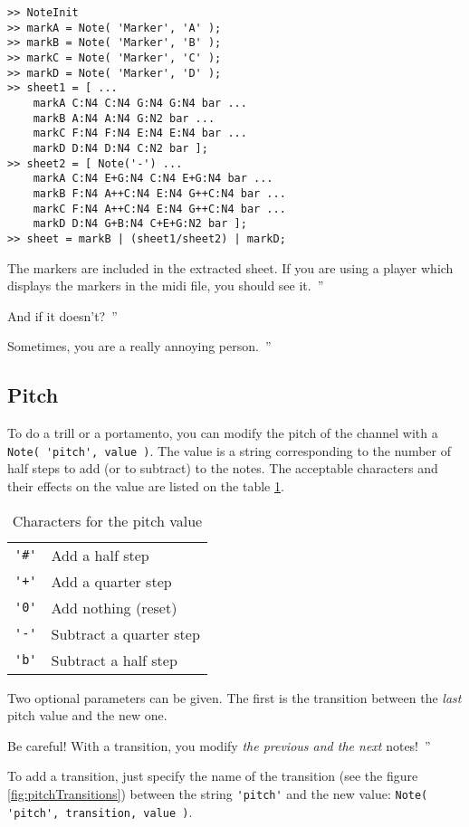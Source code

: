 \documentclass{article}
\newenvironment{meenv}{ \par \noindent \makebox[6em][r]{ \textcolor{mecolor}{Me}: `` --~}}{~''}
\newenvironment{myselfenv}{ \par \noindent \makebox[6em][r]{ \textcolor{myselfcolor}{Myself}: `` --~}}{~''}
\newcommand{\me}[1]{\begin{meenv}#1\end{meenv}}
\newcommand{\myself}[1]{\begin{myselfenv}#1\end{myselfenv}}
\begin{document}
\begin{lstlisting}
>> NoteInit
>> markA = Note( 'Marker', 'A' );
>> markB = Note( 'Marker', 'B' );
>> markC = Note( 'Marker', 'C' );
>> markD = Note( 'Marker', 'D' );
>> sheet1 = [ ...
	markA C:N4 C:N4 G:N4 G:N4 bar ...
	markB A:N4 A:N4 G:N2 bar ...
	markC F:N4 F:N4 E:N4 E:N4 bar ...
	markD D:N4 D:N4 C:N2 bar ];
>> sheet2 = [ Note('-') ...
	markA C:N4 E+G:N4 C:N4 E+G:N4 bar ...
	markB F:N4 A++C:N4 E:N4 G++C:N4 bar ...
	markC F:N4 A++C:N4 E:N4 G++C:N4 bar ...
	markD D:N4 G+B:N4 C+E+G:N2 bar ];
>> sheet = markB | (sheet1/sheet2) | markD;
\end{lstlisting}

\myself{The markers are included in the extracted sheet. If you are using a player which displays the markers in the midi file, you should see it.}
\me{And if it doesn't?}
\myself{Sometimes, you are a really annoying person.}

\subsection{Pitch}
\label{sec:Pitch}

To do a trill or a portamento, you can modify the pitch of the channel with a \lstinline!Note( 'pitch', value )!. The value is a string corresponding to the number of half steps to add (or to subtract) to the notes. The acceptable characters and their effects on the value are listed on the table \ref{tab:pitchValue}.

\begin{table}
	\centering
	\begin{tabular}{cl}
		\lstinline!'#'! & Add a half step \\
		\lstinline!'+'! & Add a quarter step \\
		\lstinline!'0'! & Add nothing (reset) \\
		\lstinline!'-'! & Subtract a quarter step \\
		\lstinline!'b'! & Subtract a half step \\
	\end{tabular}
	\caption{Characters for the pitch value}
	\label{tab:pitchValue}
\end{table}

Two optional parameters can be given. The first is the transition between the \emph{last} pitch value and the new one.

\myself{Be careful! With a transition, you modify \emph{the previous and the next} notes!}

To add a transition, just specify the name of the transition (see the figure \ref{fig:pitchTransitions}) between the string \lstinline!'pitch'! and the new value: \lstinline!Note( 'pitch', transition, value )!.
\end{document}
